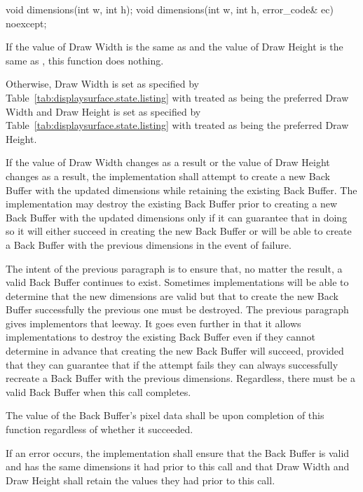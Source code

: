 \begin{itemdecl}
void dimensions(int w, int h);
void dimensions(int w, int h, error_code& ec) noexcept;
\end{itemdecl}
\begin{itemdescr}
\pnum
\effects
If the value of Draw Width is the same as  and the value of Draw Height is the same as , this function does nothing.

\pnum
Otherwise, Draw Width is set as specified by Table~\ref{tab:displaysurface.state.listing} with  treated as being the preferred Draw Width and Draw Height is set as specified by Table~\ref{tab:displaysurface.state.listing} with  treated as being the preferred Draw Height.

\pnum
If the value of Draw Width changes as a result or the value of Draw Height changes as a result, the implementation shall attempt to create a new Back Buffer with the updated dimensions while retaining the existing Back Buffer. The implementation may destroy the existing Back Buffer prior to creating a new Back Buffer with the updated dimensions only if it can guarantee that in doing so it will either succeed in creating the new Back Buffer or will be able to create a Back Buffer with the previous dimensions in the event of failure.

\pnum
\enternote
The intent of the previous paragraph is to ensure that, no matter the result, a valid Back Buffer continues to exist. Sometimes implementations will be able to determine that the new dimensions are valid but that to create the new Back Buffer successfully the previous one must be destroyed. The previous paragraph gives implementors that leeway. It goes even further in that it allows implementations to destroy the existing Back Buffer even if they cannot determine in advance that creating the new Back Buffer will succeed, provided that they can guarantee that if the attempt fails they can always successfully recreate a Back Buffer with the previous dimensions. Regardless, there must be a valid Back Buffer when this call completes.
\exitnote

\pnum
The value of the Back Buffer's pixel data shall be \unspecnorm upon completion of this function regardless of whether it succeeded.

\pnum
If an error occurs, the implementation shall ensure that the Back Buffer is valid and has the same dimensions it had prior to this call and that Draw Width and Draw Height shall retain the values they had prior to this call.


\end{itemdescr}

